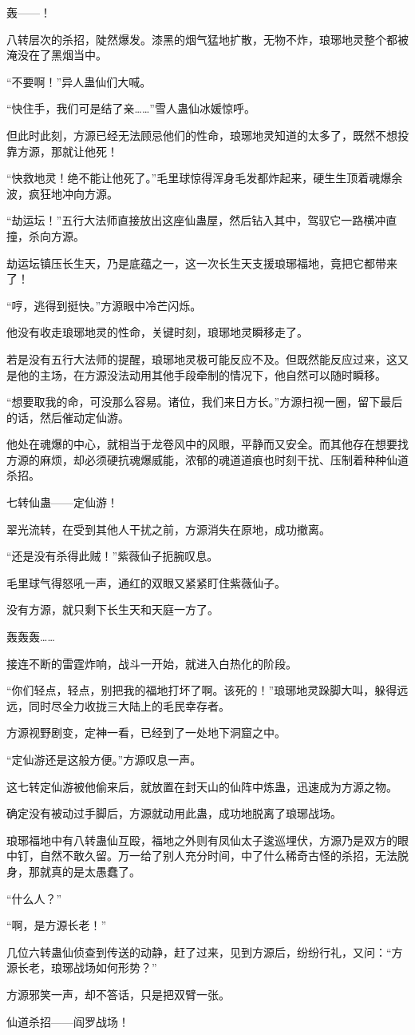 \begin{this_body}
轰——！

八转层次的杀招，陡然爆发。漆黑的烟气猛地扩散，无物不炸，琅琊地灵整个都被淹没在了黑烟当中。

“不要啊！”异人蛊仙们大喊。

“快住手，我们可是结了亲……”雪人蛊仙冰媛惊呼。

但此时此刻，方源已经无法顾忌他们的性命，琅琊地灵知道的太多了，既然不想投靠方源，那就让他死！

“快救地灵！绝不能让他死了。”毛里球惊得浑身毛发都炸起来，硬生生顶着魂爆余波，疯狂地冲向方源。

“劫运坛！”五行大法师直接放出这座仙蛊屋，然后钻入其中，驾驭它一路横冲直撞，杀向方源。

劫运坛镇压长生天，乃是底蕴之一，这一次长生天支援琅琊福地，竟把它都带来了！

“哼，逃得到挺快。”方源眼中冷芒闪烁。

他没有收走琅琊地灵的性命，关键时刻，琅琊地灵瞬移走了。

若是没有五行大法师的提醒，琅琊地灵极可能反应不及。但既然能反应过来，这又是他的主场，在方源没法动用其他手段牵制的情况下，他自然可以随时瞬移。

“想要取我的命，可没那么容易。诸位，我们来日方长。”方源扫视一圈，留下最后的话，然后催动定仙游。

他处在魂爆的中心，就相当于龙卷风中的风眼，平静而又安全。而其他存在想要找方源的麻烦，却必须硬抗魂爆威能，浓郁的魂道道痕也时刻干扰、压制着种种仙道杀招。

七转仙蛊——定仙游！

翠光流转，在受到其他人干扰之前，方源消失在原地，成功撤离。

“还是没有杀得此贼！”紫薇仙子扼腕叹息。

毛里球气得怒吼一声，通红的双眼又紧紧盯住紫薇仙子。

没有方源，就只剩下长生天和天庭一方了。

轰轰轰……

接连不断的雷霆炸响，战斗一开始，就进入白热化的阶段。

“你们轻点，轻点，别把我的福地打坏了啊。该死的！”琅琊地灵跺脚大叫，躲得远远，同时尽全力收拢三大陆上的毛民幸存者。

方源视野剧变，定神一看，已经到了一处地下洞窟之中。

“定仙游还是这般方便。”方源叹息一声。

这七转定仙游被他偷来后，就放置在封天山的仙阵中炼蛊，迅速成为方源之物。

确定没有被动过手脚后，方源就动用此蛊，成功地脱离了琅琊战场。

琅琊福地中有八转蛊仙互殴，福地之外则有凤仙太子逡巡埋伏，方源乃是双方的眼中钉，自然不敢久留。万一给了别人充分时间，中了什么稀奇古怪的杀招，无法脱身，那就真的是太愚蠢了。

“什么人？”

“啊，是方源长老！”

几位六转蛊仙侦查到传送的动静，赶了过来，见到方源后，纷纷行礼，又问：“方源长老，琅琊战场如何形势？”

方源邪笑一声，却不答话，只是把双臂一张。

仙道杀招——阎罗战场！

\end{this_body}


